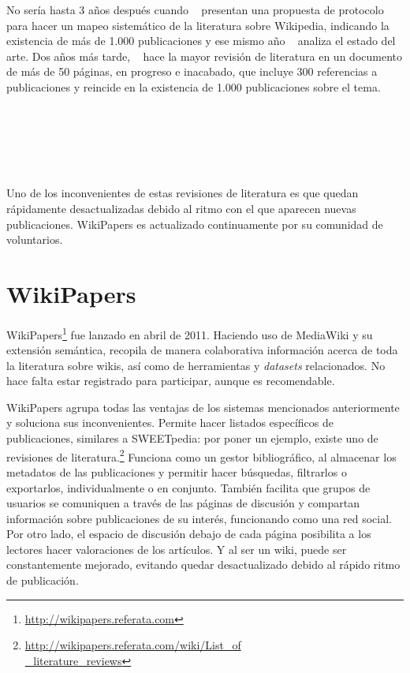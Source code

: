 \documentclass[11pt,twocolumn]{article}
\begin{document}
No sería hasta 3 años después cuando ~\citep{okoli2009b} presentan una propuesta de protocolo para hacer un mapeo sistemático de la literatura sobre Wikipedia, indicando la existencia de más de 1.000 publicaciones y ese mismo año ~\citep{okoli2009} analiza el estado del arte. Dos años más tarde, ~\citep{nielsen2011} hace la mayor revisión de literatura en un documento de más de 50 páginas, en progreso e inacabado, que incluye 300 referencias a publicaciones y reincide en la existencia de 1.000 publicaciones sobre el tema.

~\citep{martin2011}

~\citep{okoli2012}

~\citep{jullien2012}

Uno de los inconvenientes de estas revisiones de literatura es que quedan rápidamente desactualizadas debido al ritmo con el que aparecen nuevas publicaciones. WikiPapers es actualizado continuamente por su comunidad de voluntarios.

\section{WikiPapers}
WikiPapers\footnote{\href{http://wikipapers.referata.com}{http://wikipapers.referata.com}} fue lanzado en abril de 2011. Haciendo uso de MediaWiki y su extensión semántica, recopila de manera colaborativa información acerca de toda la literatura sobre wikis, así como de herramientas y \emph{datasets} relacionados. No hace falta estar registrado para participar, aunque es recomendable.

WikiPapers agrupa todas las ventajas de los sistemas mencionados anteriormente y soluciona sus inconvenientes. Permite hacer listados específicos de publicaciones, similares a SWEETpedia: por poner un ejemplo, existe uno de revisiones de literatura.\footnote{\href{http://wikipapers.referata.com/wiki/List_of_literature_reviews}{http://wikipapers.referata.com/wiki/List\_of\\ \_literature\_reviews}} Funciona como un gestor bibliográfico, al almacenar los metadatos de las publicaciones y permitir hacer búsquedas, filtrarlos o exportarlos, individualmente o en conjunto. También facilita que grupos de usuarios se comuniquen a través de las páginas de discusión y compartan información sobre publicaciones de su interés, funcionando como una red social. Por otro lado, el espacio de discusión debajo de cada página posibilita a los lectores hacer valoraciones de los artículos. Y al ser un wiki, puede ser constantemente mejorado, evitando quedar desactualizado debido al rápido ritmo de publicación.
\end{document}
